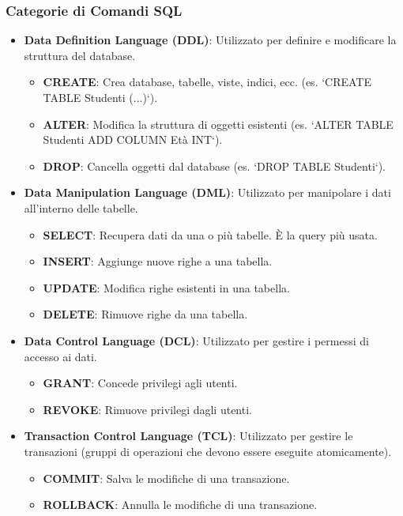 \subsubsection{Categorie di Comandi SQL}
\begin{itemize}
    \item \textbf{Data Definition Language (DDL)}: Utilizzato per definire e modificare la struttura del database.
    \begin{itemize}
        \item \textbf{CREATE}: Crea database, tabelle, viste, indici, ecc. (es. `CREATE TABLE Studenti (...)`).
        \item \textbf{ALTER}: Modifica la struttura di oggetti esistenti (es. `ALTER TABLE Studenti ADD COLUMN Età INT`).
        \item \textbf{DROP}: Cancella oggetti dal database (es. `DROP TABLE Studenti`).
    \end{itemize}
    \item \textbf{Data Manipulation Language (DML)}: Utilizzato per manipolare i dati all'interno delle tabelle.
    \begin{itemize}
        \item \textbf{SELECT}: Recupera dati da una o più tabelle. È la query più usata.
        \item \textbf{INSERT}: Aggiunge nuove righe a una tabella.
        \item \textbf{UPDATE}: Modifica righe esistenti in una tabella.
        \item \textbf{DELETE}: Rimuove righe da una tabella.
    \end{itemize}
    \item \textbf{Data Control Language (DCL)}: Utilizzato per gestire i permessi di accesso ai dati.
    \begin{itemize}
        \item \textbf{GRANT}: Concede privilegi agli utenti.
        \item \textbf{REVOKE}: Rimuove privilegi dagli utenti.
    \end{itemize}
    \item \textbf{Transaction Control Language (TCL)}: Utilizzato per gestire le transazioni (gruppi di operazioni che devono essere eseguite atomicamente).
    \begin{itemize}
        \item \textbf{COMMIT}: Salva le modifiche di una transazione.
        \item \textbf{ROLLBACK}: Annulla le modifiche di una transazione.
    \end{itemize}
\end{itemize}

